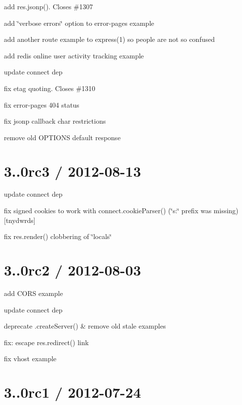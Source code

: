 \begin{DoxyItemize}
\item add {\ttfamily res.\+jsonp()}. Closes \#1307
\item add \char`\"{}verbose errors\char`\"{} option to error-\/pages example
\item add another route example to express(1) so people are not so confused
\item add redis online user activity tracking example
\item update connect dep
\item fix etag quoting. Closes \#1310
\item fix error-\/pages 404 status
\item fix jsonp callback char restrictions
\item remove old O\+P\+T\+I\+O\+N\+S default response
\end{DoxyItemize}

\section*{3..\+0rc3 / 2012-\/08-\/13 }


\begin{DoxyItemize}
\item update connect dep
\item fix signed cookies to work with {\ttfamily connect.\+cookie\+Parser()} (\char`\"{}s\+:\char`\"{} prefix was missing) \mbox{[}tnydwrds\mbox{]}
\item fix {\ttfamily res.\+render()} clobbering of \char`\"{}locals\char`\"{}
\end{DoxyItemize}

\section*{3..\+0rc2 / 2012-\/08-\/03 }


\begin{DoxyItemize}
\item add C\+O\+R\+S example
\item update connect dep
\item deprecate {\ttfamily .create\+Server()} \& remove old stale examples
\item fix\+: escape {\ttfamily res.\+redirect()} link
\item fix vhost example
\end{DoxyItemize}

\section*{3..\+0rc1 / 2012-\/07-\/24 }


